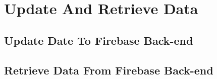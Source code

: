 \chapter{Update And Retrieve Data }
\section{Update Date To Firebase Back-end}
\section{Retrieve Data From Firebase Back-end}